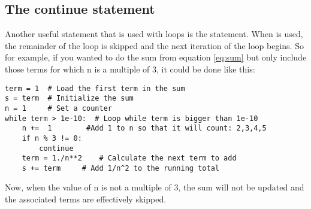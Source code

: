 \subsection*{The continue statement}
Another useful statement that is used with loops is the
 statement.  When  is used, the
remainder of the loop is skipped and the next iteration of the loop
begins.  So for example, if you wanted to do
the sum from equation \ref{eq:sum} but only include those terms for
which n is a multiple of 3, it could be done like this:

\begin{Verbatim}
term = 1  # Load the first term in the sum
s = term  # Initialize the sum
n = 1     # Set a counter
while term > 1e-10:  # Loop while term is bigger than 1e-10
    n +=  1        #Add 1 to n so that it will count: 2,3,4,5
    if n % 3 != 0:
        continue
    term = 1./n**2    # Calculate the next term to add
    s += term     # Add 1/n^2 to the running total
\end{Verbatim}

Now, when the value of n is not a multiple of 3, the sum will not be
updated and the associated terms are effectively skipped.

